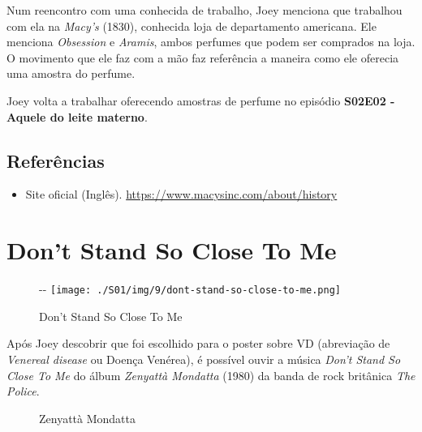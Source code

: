 Num reencontro com uma conhecida de trabalho, Joey menciona que
trabalhou com ela na \emph{Macy's} (1830), conhecida loja de
departamento americana. Ele menciona \emph{Obsession} e \emph{Aramis},
ambos perfumes que podem ser comprados na loja. O movimento que ele faz
com a mão faz referência a maneira como ele oferecia uma amostra do
perfume.

Joey volta a trabalhar oferecendo amostras de perfume no episódio
\textbf{\textcolor{primarycolor}{S02E02 - Aquele do leite materno}}.

\hypertarget{referuxeancias-1}{%
\subsection{Referências}\label{referuxeancias-1}}

\begin{itemize}
\tightlist
\item
  \sloppy Site oficial (Inglês). \url{https://www.macysinc.com/about/history}
\end{itemize}

\hypertarget{dont-stand-so-close-to-me}{%
\section{Don't Stand So Close To Me}\label{dont-stand-so-close-to-me}}

\begin{figure}[!ht]
  \begin{adjustwidth}{-\oddsidemargin-1in}{-\rightmargin}
    \centering
    \texttt{[image: ./S01/img/9/dont-stand-so-close-to-me.png]}
    \caption{Don’t Stand So Close To Me\label{fig:don-t-stand-so-close-to-me}}
  \end{adjustwidth}
\end{figure}

Após Joey descobrir que foi escolhido para o poster sobre VD (abreviação
de \emph{Venereal disease} ou Doença Venérea), é possível ouvir a música
\emph{Don't Stand So Close To Me} do álbum \emph{Zenyattà Mondatta}
(1980) da banda de rock britânica \emph{The Police}.

\begin{figure}
  \centering
    \caption{Zenyattà Mondatta\label{fig:zenyatt-mondatta}}
\end{figure}

